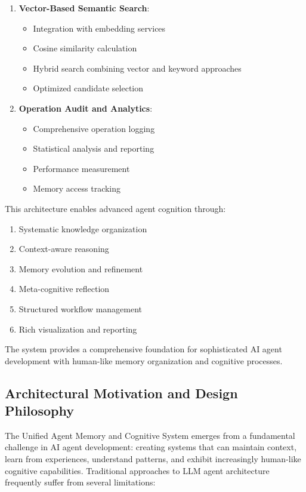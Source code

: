 \documentclass[12pt,a4paper]{article}
\begin{document}
\begin{enumerate}[label=\arabic*.]
    \item \textbf{Vector-Based Semantic Search}:
    \begin{itemize}
        \item Integration with embedding services
        \item Cosine similarity calculation
        \item Hybrid search combining vector and keyword approaches
        \item Optimized candidate selection
    \end{itemize}

    \item \textbf{Operation Audit and Analytics}:
    \begin{itemize}
        \item Comprehensive operation logging
        \item Statistical analysis and reporting
        \item Performance measurement
        \item Memory access tracking
    \end{itemize}
\end{enumerate}

This architecture enables advanced agent cognition through:
\begin{enumerate}[label=\arabic*.]
    \item Systematic knowledge organization
    \item Context-aware reasoning
    \item Memory evolution and refinement
    \item Meta-cognitive reflection
    \item Structured workflow management
    \item Rich visualization and reporting
\end{enumerate}

The system provides a comprehensive foundation for sophisticated AI agent development with human-like memory organization and cognitive processes.

\subsection*{Architectural Motivation and Design Philosophy}

The Unified Agent Memory and Cognitive System emerges from a fundamental challenge in AI agent development: creating systems that can maintain context, learn from experiences, understand patterns, and exhibit increasingly human-like cognitive capabilities. Traditional approaches to LLM agent architecture frequently suffer from several limitations:
\end{document}
